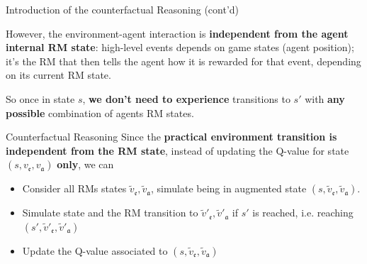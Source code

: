 \documentclass[10pt, aspectratio=169]{beamer}
\newcommand{\evidenzia}[1]{\textcolor{verdeSalvia}{\textbf{#1}}}
\begin{document}
\begin{frame}{Introduction of the counterfactual Reasoning (cont'd)}

    However, the environment-agent interaction is \evidenzia{independent from the agent internal RM state}: high-level events depends on game states (agent position); it's the RM that then tells the agent how it is rewarded for that event, depending on its current RM state.

    So once in state $s$, \evidenzia{we don't need to experience} transitions to $s'$ with \evidenzia{any possible} combination of %
    agents RM states.
    
    \vspace{0.2cm}
    \begin{block}{Counterfactual Reasoning}
    Since the \evidenzia{practical environment transition is independent from the RM state}, instead of updating the Q-value for state $(s, v_{\mathfrak{e}}, v_{\mathfrak{a}})$ \evidenzia{only}, we can
    \begin{itemize}
        \item Consider all RMs states $\tilde v_{\mathfrak{e}},\tilde v_{\mathfrak{a}}$, simulate being in augmented state $(s, \tilde v_{\mathfrak{e}},\tilde v_{\mathfrak{a}})$.
        \item Simulate state and the RM transition to $\tilde v'_{\mathfrak{e}},\tilde v'_{\mathfrak{a}}$ if $s'$ is reached, i.e. reaching $(s', \tilde v'_{\mathfrak{e}},\tilde v'_{\mathfrak{a}})$
        \item Update  the Q-value associated to $(s, \tilde v_{\mathfrak{e}},\tilde v_{\mathfrak{a}})$
    \end{itemize} 
    \end{block}

\end{frame}
\end{document}
